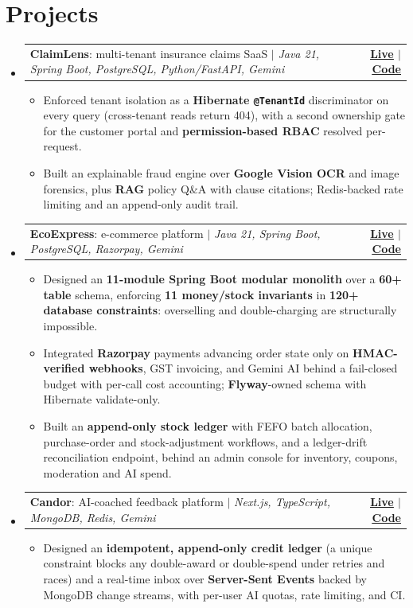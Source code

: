 \documentclass[letterpaper,11pt]{article}
\makeatletter
\newcommand{\resumeItem}[1]{
  \item\small{
    {#1 \vspace{-2pt}}
  }
}
\newcommand{\resumeProjectHeading}[2]{
    \item
    \begin{tabular*}{1.001\textwidth}{l@{\extracolsep{\fill}}r}
      \small#1 & \textbf{\small #2}\\
    \end{tabular*}\vspace{-7pt}
}
\newcommand{\resumeSubHeadingListStart}{\begin{itemize}[leftmargin=0.0in, label={}]}
\newcommand{\resumeSubHeadingListEnd}{\end{itemize}}
\newcommand{\resumeItemListStart}{\begin{itemize}}
\newcommand{\resumeItemListEnd}{\end{itemize}\vspace{-5pt}}
\makeatother
\begin{document}
\section{Projects}
    \vspace{-5pt}
    \resumeSubHeadingListStart
      \resumeProjectHeading
          {\textbf{ClaimLens}: multi-tenant insurance claims SaaS $|$ \emph{Java 21, Spring Boot, PostgreSQL, Python/FastAPI, Gemini}}{\href{https://claimlens-ten.vercel.app}{\underline{Live}} $|$ \href{https://github.com/Yogesh0627/Claim-Lens}{\underline{Code}}}
          \resumeItemListStart
            \resumeItem{Enforced tenant isolation as a \textbf{Hibernate \texttt{@TenantId}} discriminator on every query (cross-tenant reads return 404), with a second ownership gate for the customer portal and \textbf{permission-based RBAC} resolved per-request.}
            \resumeItem{Built an explainable fraud engine over \textbf{Google Vision OCR} and image forensics, plus \textbf{RAG} policy Q\&A with clause citations; Redis-backed rate limiting and an append-only audit trail.}
          \resumeItemListEnd
          \vspace{-13pt}
      \resumeProjectHeading
          {\textbf{EcoExpress}: e-commerce platform $|$ \emph{Java 21, Spring Boot, PostgreSQL, Razorpay, Gemini}}{\href{https://ecoexpress-nu.vercel.app}{\underline{Live}} $|$ \href{https://github.com/Yogesh0627/ecom-exp}{\underline{Code}}}
          \resumeItemListStart
            \resumeItem{Designed an \textbf{11-module Spring Boot modular monolith} over a \textbf{60+ table} schema, enforcing \textbf{11 money/stock invariants} in \textbf{120+ database constraints}: overselling and double-charging are structurally impossible.}
            \resumeItem{Integrated \textbf{Razorpay} payments advancing order state only on \textbf{HMAC-verified webhooks}, GST invoicing, and Gemini AI behind a fail-closed budget with per-call cost accounting; \textbf{Flyway}-owned schema with Hibernate validate-only.}
            \resumeItem{Built an \textbf{append-only stock ledger} with FEFO batch allocation, purchase-order and stock-adjustment workflows, and a ledger-drift reconciliation endpoint, behind an admin console for inventory, coupons, moderation and AI spend.}
          \resumeItemListEnd
          \vspace{-13pt}
      \resumeProjectHeading
          {\textbf{Candor}: AI-coached feedback platform $|$ \emph{Next.js, TypeScript, MongoDB, Redis, Gemini}}{\href{https://candor-cyan.vercel.app}{\underline{Live}} $|$ \href{https://github.com/Yogesh0627/anonymous-message-app}{\underline{Code}}}
          \resumeItemListStart
            \resumeItem{Designed an \textbf{idempotent, append-only credit ledger} (a unique constraint blocks any double-award or double-spend under retries and races) and a real-time inbox over \textbf{Server-Sent Events} backed by MongoDB change streams, with per-user AI quotas, rate limiting, and CI.}
          \resumeItemListEnd
    \resumeSubHeadingListEnd
\vspace{-9pt}
\end{document}
